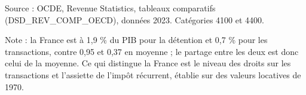 Source : OCDE, Revenue Statistics, tableaux comparatifs (DSD\_REV\_COMP\_OECD), données 2023. Catégories 4100 et 4400.\par Note : la France est à 1,9 \% du PIB pour la détention et 0,7 \% pour les transactions, contre 0,95 et 0,37 en moyenne ; le partage entre les deux est donc celui de la moyenne. Ce qui distingue la France est le niveau des droits sur les transactions et l'assiette de l'impôt récurrent, établie sur des valeurs locatives de 1970.
